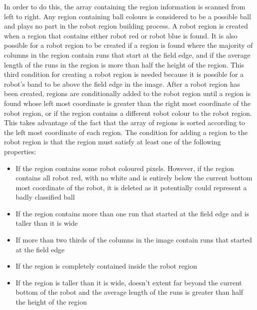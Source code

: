 \documentclass[pdftex,11pt,a4paper]{report}
\begin{document}
In order to do this, the array containing the region information is scanned from left to right. Any region containing ball colours is considered to be a possible ball and plays no part in the robot region building process. A robot region is created when a region that contains either robot red or robot blue is found. It is also possible for a robot region to be created if a region is found where the majority of columns in the region contain runs that start at the field edge, and if the average length of the runs in the region is more than half the height of the region. This third condition for creating a robot region is needed because it is possible for a robot's band to be above the field edge in the image. After a robot region has been created, regions are conditionally added to the robot region until a region is found whose left most coordinate is greater than the right most coordinate of the robot region, or if the region contains a different robot colour to the robot region. This takes advantage of the fact that the array of regions is sorted according to the left most coordinate of each region. The condition for adding a region to the robot region is that the region must satisfy at least one of the following properties: \begin{itemize}
\item{If the region contains some robot coloured pixels. However, if the region contains all robot red, with no white and is entirely below the current bottom most coordinate of the robot, it is deleted as it potentially could represent a badly classified ball}
\item{If the region contains more than one run that started at the field edge and is taller than it is wide}
\item{If more than two thirds of the columns in the image contain runs that started at the field edge}
\item{If the region is completely contained inside the robot region}
\item{If the region is taller than it is wide, doesn't extent far beyond the current bottom of the robot and the average length of the runs is greater than half the height of the region}
\end{itemize}
\end{document}
